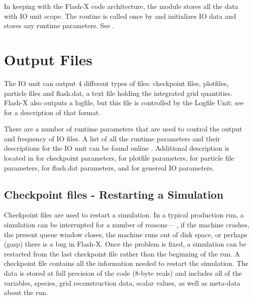 In keeping with the Flash-X code architecture, the  module
 stores all the data with \unit{IO} unit scope. The routine
 is called once by  and
initializes \unit{IO} data and stores any runtime parameters. See
.



\section{Output Files}
The IO unit can output 4 different types of files: checkpoint
files, plotfiles, particle files and flash.dat, a text file holding
the integrated grid quantities.  Flash-X also outputs a logfile, but this
file is controlled by the Logfile Unit; see 
for a description of that format.


There are a number of runtime parameters that are used to control the
output and frequency of IO files.  A list of all the runtime parameters and
their descriptions for the \unit{IO} unit can be found online
.  Additional description is located in  
 for checkpoint parameters, 
 for plotfile parameters,
 for particle file parameters, 
 for flash.dat parameters,
and  for genereal IO parameters.
 

\subsection{Checkpoint files - Restarting a Simulation}
Checkpoint files are used to restart a simulation.  In a typical
production run, a simulation can be interrupted for a number of
reasons--- \eg, if the machine crashes, the present queue window
closes, the machine runs out of disk space, or perhaps (gasp) there is a bug
in Flash-X.  Once the problem is fixed, a simulation can be restarted
from the last checkpoint file rather than the beginning of the run.  A
checkpoint file%
contains all the
information needed to restart the simulation.  The data is stored at
full precision of the code (8-byte reals) and includes all of the
variables, species, grid reconstruction data, scalar values,  as well
as meta-data about the run.

